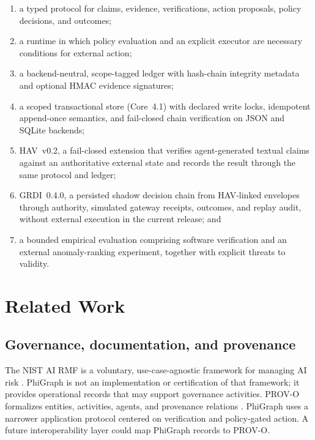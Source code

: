 \documentclass[11pt]{article}
\begin{document}
\begin{enumerate}[leftmargin=*]
  \item a typed protocol for claims, evidence, verifications, action proposals,
        policy decisions, and outcomes;
  \item a runtime in which policy evaluation and an explicit executor are
        necessary conditions for external action;
  \item a backend-neutral, scope-tagged ledger with hash-chain integrity
        metadata and optional HMAC evidence signatures;
  \item a scoped transactional store (Core~4.1) with declared write locks,
        idempotent append-once semantics, and fail-closed chain verification
        on JSON and SQLite backends;
  \item HAV~v0.2, a fail-closed extension that verifies agent-generated
        textual claims against an authoritative external state and records
        the result through the same protocol and ledger;
  \item GRDI~0.4.0, a persisted shadow decision chain from HAV-linked envelopes
        through authority, simulated gateway receipts, outcomes, and replay
        audit, without external execution in the current release; and
  \item a bounded empirical evaluation comprising software verification and an
        external anomaly-ranking experiment, together with explicit threats to
        validity.
\end{enumerate}

\section{Related Work}

\subsection{Governance, documentation, and provenance}

The NIST AI RMF is a voluntary, use-case-agnostic framework for managing AI
risk \cite{nist2023airmf}. PhiGraph is not an implementation or certification
of that framework; it provides operational records that may support governance
activities. PROV-O formalizes entities, activities, agents, and provenance
relations \cite{lebo2013provo}. PhiGraph uses a narrower application protocol
centered on verification and policy-gated action. A future interoperability
layer could map PhiGraph records to PROV-O.
\end{document}

